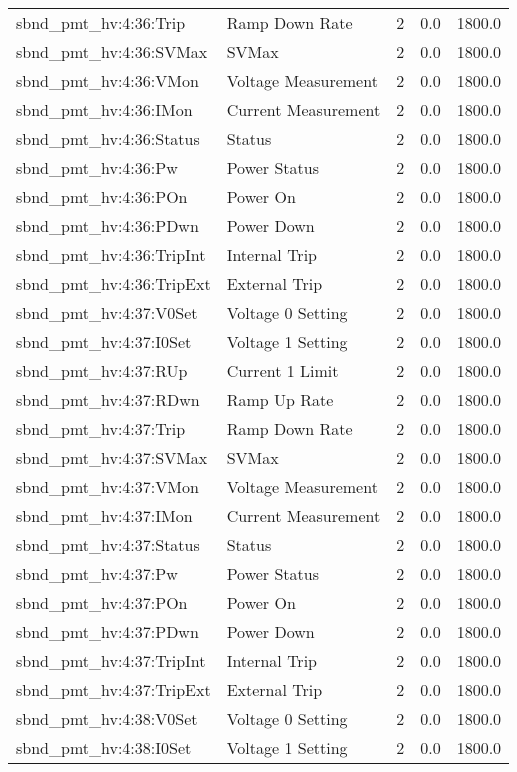 \begin{center}
\begin{longtable}{l | l l l l }
sbnd\_pmt\_hv:4:36:Trip & Ramp Down Rate & 2 & 0.0 & 1800.0\\ 
sbnd\_pmt\_hv:4:36:SVMax & SVMax & 2 & 0.0 & 1800.0\\ 
sbnd\_pmt\_hv:4:36:VMon & Voltage Measurement & 2 & 0.0 & 1800.0\\ 
sbnd\_pmt\_hv:4:36:IMon & Current Measurement & 2 & 0.0 & 1800.0\\ 
sbnd\_pmt\_hv:4:36:Status & Status & 2 & 0.0 & 1800.0\\ 
sbnd\_pmt\_hv:4:36:Pw & Power Status & 2 & 0.0 & 1800.0\\ 
sbnd\_pmt\_hv:4:36:POn & Power On & 2 & 0.0 & 1800.0\\ 
sbnd\_pmt\_hv:4:36:PDwn & Power Down & 2 & 0.0 & 1800.0\\ 
sbnd\_pmt\_hv:4:36:TripInt & Internal Trip & 2 & 0.0 & 1800.0\\ 
sbnd\_pmt\_hv:4:36:TripExt & External Trip & 2 & 0.0 & 1800.0\\ 
sbnd\_pmt\_hv:4:37:V0Set & Voltage 0 Setting & 2 & 0.0 & 1800.0\\ 
sbnd\_pmt\_hv:4:37:I0Set & Voltage 1 Setting & 2 & 0.0 & 1800.0\\ 
sbnd\_pmt\_hv:4:37:RUp & Current 1 Limit & 2 & 0.0 & 1800.0\\ 
sbnd\_pmt\_hv:4:37:RDwn & Ramp Up Rate & 2 & 0.0 & 1800.0\\ 
sbnd\_pmt\_hv:4:37:Trip & Ramp Down Rate & 2 & 0.0 & 1800.0\\ 
sbnd\_pmt\_hv:4:37:SVMax & SVMax & 2 & 0.0 & 1800.0\\ 
sbnd\_pmt\_hv:4:37:VMon & Voltage Measurement & 2 & 0.0 & 1800.0\\ 
sbnd\_pmt\_hv:4:37:IMon & Current Measurement & 2 & 0.0 & 1800.0\\ 
sbnd\_pmt\_hv:4:37:Status & Status & 2 & 0.0 & 1800.0\\ 
sbnd\_pmt\_hv:4:37:Pw & Power Status & 2 & 0.0 & 1800.0\\ 
sbnd\_pmt\_hv:4:37:POn & Power On & 2 & 0.0 & 1800.0\\ 
sbnd\_pmt\_hv:4:37:PDwn & Power Down & 2 & 0.0 & 1800.0\\ 
sbnd\_pmt\_hv:4:37:TripInt & Internal Trip & 2 & 0.0 & 1800.0\\ 
sbnd\_pmt\_hv:4:37:TripExt & External Trip & 2 & 0.0 & 1800.0\\ 
sbnd\_pmt\_hv:4:38:V0Set & Voltage 0 Setting & 2 & 0.0 & 1800.0\\ 
sbnd\_pmt\_hv:4:38:I0Set & Voltage 1 Setting & 2 & 0.0 & 1800.0\\ 

\end{longtable}
\end{center}
